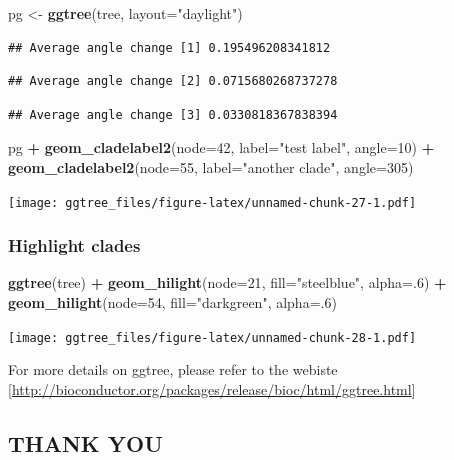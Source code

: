\documentclass[]{article}
\newenvironment{Shaded}{\begin{snugshade}}{\end{snugshade}}
\newcommand{\KeywordTok}[1]{\textcolor[rgb]{0.13,0.29,0.53}{\textbf{#1}}}
\newcommand{\DataTypeTok}[1]{\textcolor[rgb]{0.13,0.29,0.53}{#1}}
\newcommand{\DecValTok}[1]{\textcolor[rgb]{0.00,0.00,0.81}{#1}}
\newcommand{\StringTok}[1]{\textcolor[rgb]{0.31,0.60,0.02}{#1}}
\newcommand{\OperatorTok}[1]{\textcolor[rgb]{0.81,0.36,0.00}{\textbf{#1}}}
\newcommand{\NormalTok}[1]{#1}
\begin{document}
\begin{Shaded}
\begin{Highlighting}[]
\NormalTok{pg <-}\StringTok{ }\KeywordTok{ggtree}\NormalTok{(tree, }\DataTypeTok{layout=}\StringTok{"daylight"}\NormalTok{)}
\end{Highlighting}
\end{Shaded}

\begin{verbatim}
## Average angle change [1] 0.195496208341812
\end{verbatim}

\begin{verbatim}
## Average angle change [2] 0.0715680268737278
\end{verbatim}

\begin{verbatim}
## Average angle change [3] 0.0330818367838394
\end{verbatim}

\begin{Shaded}
\begin{Highlighting}[]
\NormalTok{pg }\OperatorTok{+}\StringTok{ }\KeywordTok{geom_cladelabel2}\NormalTok{(}\DataTypeTok{node=}\DecValTok{42}\NormalTok{, }\DataTypeTok{label=}\StringTok{"test label"}\NormalTok{, }\DataTypeTok{angle=}\DecValTok{10}\NormalTok{) }\OperatorTok{+}
\StringTok{  }\KeywordTok{geom_cladelabel2}\NormalTok{(}\DataTypeTok{node=}\DecValTok{55}\NormalTok{, }\DataTypeTok{label=}\StringTok{"another clade"}\NormalTok{, }\DataTypeTok{angle=}\DecValTok{305}\NormalTok{)}
\end{Highlighting}
\end{Shaded}

\texttt{[image: ggtree\_files/figure-latex/unnamed-chunk-27-1.pdf]}

\subsubsection{Highlight clades}\label{highlight-clades}

\begin{Shaded}
\begin{Highlighting}[]
\KeywordTok{ggtree}\NormalTok{(tree) }\OperatorTok{+}\StringTok{ }\KeywordTok{geom_hilight}\NormalTok{(}\DataTypeTok{node=}\DecValTok{21}\NormalTok{, }\DataTypeTok{fill=}\StringTok{"steelblue"}\NormalTok{, }\DataTypeTok{alpha=}\NormalTok{.}\DecValTok{6}\NormalTok{) }\OperatorTok{+}
\StringTok{  }\KeywordTok{geom_hilight}\NormalTok{(}\DataTypeTok{node=}\DecValTok{54}\NormalTok{, }\DataTypeTok{fill=}\StringTok{"darkgreen"}\NormalTok{, }\DataTypeTok{alpha=}\NormalTok{.}\DecValTok{6}\NormalTok{)}
\end{Highlighting}
\end{Shaded}

\texttt{[image: ggtree\_files/figure-latex/unnamed-chunk-28-1.pdf]}

For more details on ggtree, please refer to the webiste
{[}\url{http://bioconductor.org/packages/release/bioc/html/ggtree.html}{]}

\subsection{THANK YOU}\label{thank-you}
\end{document}
